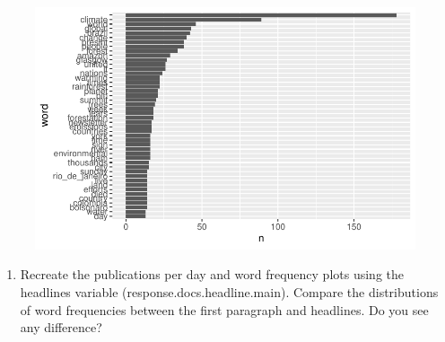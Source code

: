 \documentclass[
  letterpaper,
  DIV=11,
  numbers=noendperiod]{scrartcl}
\providecommand{\tightlist}{%
  \setlength{\itemsep}{0pt}\setlength{\parskip}{0pt}}\usepackage{longtable,booktabs,array}
\begin{document}
\begin{figure}[H]

{\centering \includegraphics{lab1_Ayala_files/figure-pdf/unnamed-chunk-8-1.pdf}

}

\end{figure}

\begin{enumerate}
\def\labelenumi{\arabic{enumi}.}
\setcounter{enumi}{4}
\tightlist
\item
  Recreate the publications per day and word frequency plots using the
  headlines variable (response.docs.headline.main). Compare the
  distributions of word frequencies between the first paragraph and
  headlines. Do you see any difference?
\end{enumerate}
\end{document}
